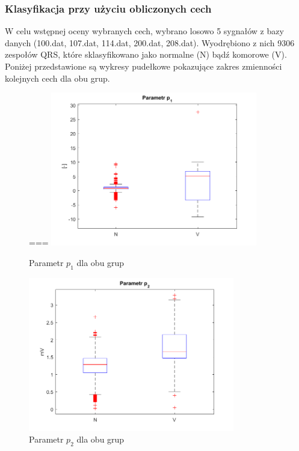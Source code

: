 \documentclass[[10pt,a4paper]{article}
\begin{document}
\subsubsection{Klasyfikacja przy użyciu obliczonych cech}
W celu wstępnej oceny wybranych cech, wybrano losowo 5 sygnałów z bazy danych (100.dat, 107.dat, 114.dat, 200.dat, 208.dat). Wyodrębiono z nich 9306 zespołów QRS, które sklasyfikowano jako normalne (N) bądź komorowe (V). Poniżej przedstawione są wykresy pudełkowe pokazujące zakres zmienności kolejnych cech dla obu grup.

\begin{figure}[H]
	\begin{center}
===		\includegraphics[width=9cm]{p1.png}
		\caption{Parametr $p_1$ dla obu grup}
	\end{center}
\end{figure}

\begin{figure}[H]
	\begin{center}
		\includegraphics[width=9cm]{p2.png}
		\caption{Parametr $p_2$ dla obu grup}
	\end{center}
\end{figure}
\end{document}
